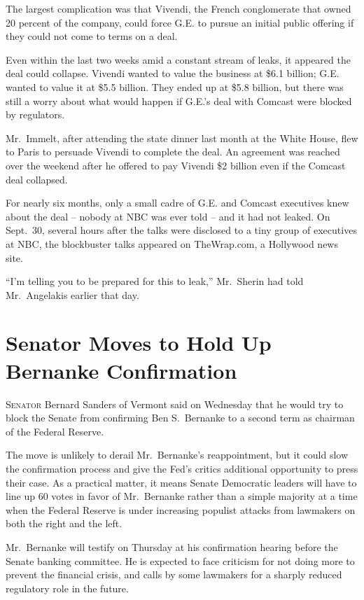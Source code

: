 ﻿\documentclass[12pt]{article}
\begin{document}
The largest complication was that Vivendi, the French conglomerate that owned 20 percent of the
company, could force G.E. to pursue an initial public offering if they could not come to terms on a
deal.

Even within the last two weeks amid a constant stream of leaks, it appeared the deal could collapse.
Vivendi wanted to value the business at \$6.1 billion; G.E. wanted to value it at \$5.5 billion.
They ended up at \$5.8 billion, but there was still a worry about what would happen if G.E.'s deal
with Comcast were blocked by regulators.

Mr.~Immelt, after attending the state dinner last month at the White House, flew to Paris to
persuade Vivendi to complete the deal. An agreement was reached over the weekend after he offered to
pay Vivendi \$2 billion even if the Comcast deal collapsed.

For nearly six months, only a small cadre of G.E. and Comcast executives knew about the deal --
nobody at NBC was ever told -- and it had not leaked. On Sept.~30, several hours after the talks
were disclosed to a tiny group of executives at NBC, the blockbuster talks appeared on TheWrap.com,
a Hollywood news site.

``I'm telling you to be prepared for this to leak,'' Mr.~Sherin had told Mr.~Angelakis earlier that
day.

\section{Senator Moves to Hold Up Bernanke Confirmation}

\lettrine{S}{enator} Bernard Sanders of Vermont said on Wednesday that he
would try to block the Senate from confirming Ben S.~Bernanke to a second term as chairman of the
Federal Reserve.

The move is unlikely to derail Mr.~Bernanke's reappointment, but it could slow the confirmation
process and give the Fed's critics additional opportunity to press their case. As a practical
matter, it means Senate Democratic leaders will have to line up 60 votes in favor of Mr.~Bernanke
rather than a simple majority at a time when the Federal Reserve is under increasing populist
attacks from lawmakers on both the right and the left.

Mr.~Bernanke will testify on Thursday at his confirmation hearing before the Senate banking
committee. He is expected to face criticism for not doing more to prevent the financial crisis, and
calls by some lawmakers for a sharply reduced regulatory role in the future.
\end{document}
